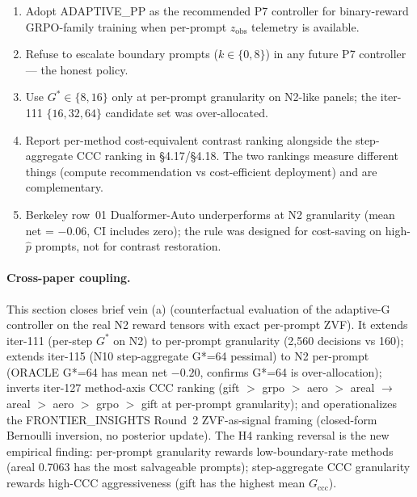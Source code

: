 \begin{enumerate}
\item Adopt ADAPTIVE\_PP as the recommended P7 controller for binary-reward
      GRPO-family training when per-prompt $z_{\mathrm{obs}}$ telemetry
      is available.
\item Refuse to escalate boundary prompts ($k \in \{0, 8\}$) in any future
      P7 controller — the honest policy.
\item Use $G^* \in \{8, 16\}$ only at per-prompt granularity on N2-like
      panels; the iter-111 $\{16, 32, 64\}$ candidate set was over-allocated.
\item Report per-method cost-equivalent contrast ranking alongside the
      step-aggregate CCC ranking in §4.17/§4.18. The two rankings measure
      different things (compute recommendation vs cost-efficient
      deployment) and are complementary.
\item Berkeley row~01 Dualformer-Auto underperforms at N2 granularity
      (mean net = $-0.06$, CI includes zero); the rule was designed for
      cost-saving on high-$\hat{p}$ prompts, not for contrast restoration.
\end{enumerate}

\paragraph{Cross-paper coupling.}

This section closes brief vein (a) (counterfactual evaluation of the
adaptive-G controller on the real N2 reward tensors with exact per-prompt
ZVF). It extends iter-111 (per-step $G^*$ on N2) to per-prompt granularity
(2,560 decisions vs 160); extends iter-115 (N10 step-aggregate G*=64
pessimal) to N2 per-prompt (ORACLE G*=64 has mean net $-0.20$, confirms
G*=64 is over-allocation); inverts iter-127 method-axis CCC ranking
(gift $>$ grpo $>$ aero $>$ areal $\to$ areal $>$ aero $>$ grpo $>$ gift at
per-prompt granularity); and operationalizes the FRONTIER\_INSIGHTS Round~2
ZVF-as-signal framing (closed-form Bernoulli inversion, no posterior
update). The H4 ranking reversal is the new empirical finding: per-prompt
granularity rewards low-boundary-rate methods (areal 0.7063 has the most
salvageable prompts); step-aggregate CCC granularity rewards high-CCC
aggressiveness (gift has the highest mean $G_{\mathrm{ccc}}$).